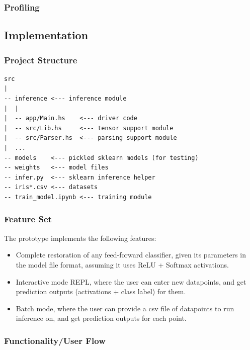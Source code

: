 \documentclass[12pt, titlepage]{article}
\begin{document}
\subsubsection{Profiling}

\subsection{Implementation}
\subsubsection{Project Structure}
\begin{verbatim}
src
|
-- inference <--- inference module
|  |
|  -- app/Main.hs    <--- driver code
|  -- src/Lib.hs     <--- tensor support module
|  -- src/Parser.hs  <--- parsing support module
|  ...
-- models    <--- pickled sklearn models (for testing)
-- weights   <--- model files
-- infer.py  <--- sklearn inference helper
-- iris*.csv <--- datasets
-- train_model.ipynb <--- training module
\end{verbatim}

\subsubsection{Feature Set}
The prototype implements the following features:
\begin{itemize}
	\item Complete restoration of any feed-forward classifier, given its parameters in the model file format, assuming it uses ReLU + Softmax activations.
	\item Interactive mode REPL, where the user can enter new datapoints, and get prediction outputs (activations + class label) for them.
	\item Batch mode, where the user can provide a csv file of datapoints to run inference on, and get prediction outputs for each point.
\end{itemize}

\subsubsection{Functionality/User Flow}
\end{document}

